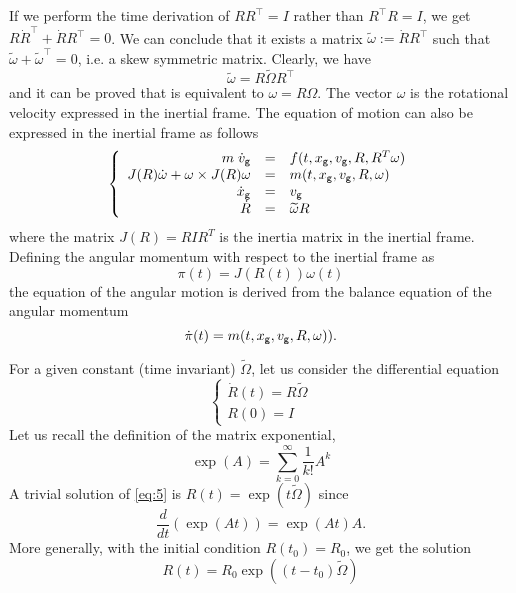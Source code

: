 \begin{remark}
If we perform the time derivation of $RR^\top =I$ rather than $R^\top R=I$, we get $R \dot R^\top + \dot R R^\top =0$.  We can conclude that it exists a matrix $\tilde \omega := \dot R R^\top $ such that $\tilde \omega + \tilde \omega^\top=0$, i.e. a skew symmetric matrix. Clearly, we have
 \begin{equation}
   \label{eq:4}
   \tilde \omega = R \tilde \Omega R^\top
 \end{equation}
 and it can be proved that is equivalent to $ \omega =R \Omega$. The vector $\omega$ is the rotational velocity expressed in the inertial frame. The equation of motion can also be expressed in the inertial frame as follows
  \begin{equation}
  \label{eq:motion-NewtonEuler-inertial}
  \left\{\begin{array}{rcl}
      m \;\dot v_{\sf \small g}  & = &f(t,x_{\sf \small g}, v_{\sf \small g},  R,  R^T \omega) \\
      J(R) \dot \omega + \omega \times J(R) \omega &= & m(t,x_{\sf \small g}, v_{\sf \small g}, R, \omega) \\
      \dot x_{\sf \small g}&=& v_{\sf \small g}\\
      \dot R  &=& \widetilde \omega R
    \end{array}
  \right.
\end{equation}
where the matrix $J(R) = R I R^T$ is the inertia matrix in the inertial frame.
Defining the angular momentum with respect to the inertial frame as
\begin{equation}
  \label{eq:1}
  \pi(t) = J(R(t)) \omega(t)
\end{equation}
the equation of the angular motion is derived from the balance equation of the angular momentum
\begin{equation}
  \label{eq:5}
  \dot \pi(t) = m(t,x_{\sf \small g}, v_{\sf \small g}, R, \omega)).
\end{equation}

\end{remark}

For a given constant (time invariant) $\tilde \Omega$, let us consider the differential equation
\begin{equation}
  \label{eq:5}
  \begin{cases}
    \dot R(t) = R \tilde \Omega\\
    R(0) = I
  \end{cases}
\end{equation}
Let us recall the definition of the matrix exponential,
\begin{equation}
  \label{eq:6}
  \exp(A) = \sum_{k=0}^{\infty} \frac {1}{k!} A^k
\end{equation}
A trivial solution of \eqref{eq:5} is $R(t) = \exp(t\tilde\Omega) $ since
\begin{equation}
  \label{eq:7}
  \frac {d}{dt}(\exp(At)) = \exp(At) A.
\end{equation}
More generally, with the initial condition $R(t_0)= R_0$, we get the solution
\begin{equation}
R(t) = R_0 \exp((t-t_0)\tilde\Omega)\label{eq:8}
\end{equation}

